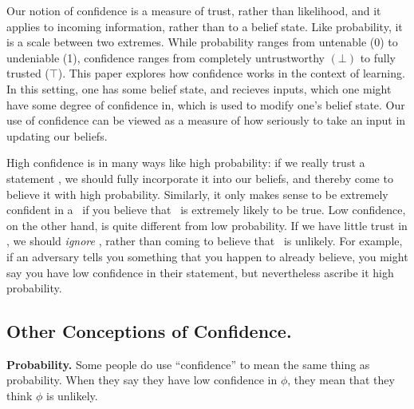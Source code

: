 Our notion of
confidence is a measure of trust, rather than likelihood,
 and it applies to incoming information, rather than to  a belief state.
Like probability, it is a scale between two extremes.
While probability ranges from untenable (0) to undeniable (1),
confidence ranges from completely untrustworthy $(\bot)$ to fully trusted ($\top$).
%
This paper explores how confidence works in the context of learning.
In this setting, one has some belief state, and recieves inputs, which one might have some degree of confidence in, which is used to modify one's belief state.
Our use of confidence can be viewed as a measure of how seriously to take an input in updating our beliefs.

High confidence is in many ways like high probability: if we really trust a statement \stmt, we should fully incorporate it into our beliefs, and thereby come to believe it with high probability.
Similarly, it only makes sense to be extremely confident in a \stmt\ if you believe that \stmt\ is extremely likely to be true.
Low confidence, on the other hand, is quite different from low probability.
If we have little trust in \stmt, we should \emph{ignore} \stmt, rather than coming to believe that \stmt\ is unlikely.
For example, if an adversary tells you something that you happen to already believe,
you might say you have low confidence in their statement, but nevertheless ascribe it high probability.


\subsection{Other Conceptions of Confidence.}

\textbf{Probability.}
Some people do use ``confidence'' to mean the same thing as probability. When they say they have low confidence in $\phi$, they mean that they think $\phi$ is unlikely.

